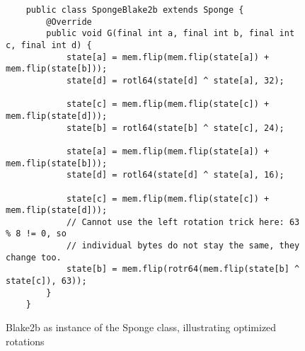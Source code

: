 %
%
%
%
%
%
%
%

\begin{figure}
\small
\begin{verbatim}
    public class SpongeBlake2b extends Sponge {
        @Override
        public void G(final int a, final int b, final int c, final int d) {
            state[a] = mem.flip(mem.flip(state[a]) + mem.flip(state[b]));
            state[d] = rotl64(state[d] ^ state[a], 32);

            state[c] = mem.flip(mem.flip(state[c]) + mem.flip(state[d]));
            state[b] = rotl64(state[b] ^ state[c], 24);

            state[a] = mem.flip(mem.flip(state[a]) + mem.flip(state[b]));
            state[d] = rotl64(state[d] ^ state[a], 16);

            state[c] = mem.flip(mem.flip(state[c]) + mem.flip(state[d]));
            // Cannot use the left rotation trick here: 63 % 8 != 0, so
            // individual bytes do not stay the same, they change too.
            state[b] = mem.flip(rotr64(mem.flip(state[b] ^ state[c]), 63));
        }
    }
\end{verbatim}
\normalsize
\caption{Blake2b as instance of the Sponge class, illustrating optimized rotations}
\label{fig:sponge-blake2b}
\end{figure}
